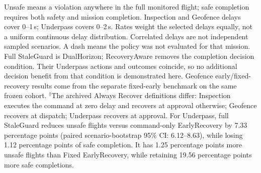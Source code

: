 \begin{table}[t]
\smallskip
\begin{minipage}{\textwidth}
\footnotesize
Unsafe means a violation anywhere in the full monitored flight;
safe completion requires both safety and mission completion.
Inspection and Geofence delays cover 0--1\,s; Underpass covers 0--2\,s.
Rates weight the selected delays equally, not a uniform continuous delay
distribution. Correlated delays are not independent sampled scenarios.
A dash means the policy was not evaluated for that mission. Full StaleGuard
is DualHorizon; RecoveryAware removes the completion decision condition.
Their Underpass actions and outcomes coincide, so no additional decision
benefit from that condition is demonstrated here.
Geofence early/fixed-recovery results come from the separate fixed-early
benchmark on the same frozen cohort.
$^{\dagger}$The archived Always Recover definitions differ: Inspection
executes the command at zero delay and recovers at approval otherwise;
Geofence recovers at dispatch; Underpass recovers at approval.
For Underpass, full StaleGuard reduces unsafe flights versus command-only
EarlyRecovery by 7.33 percentage points (paired scenario-bootstrap 95\% CI:
6.12--8.63), while losing 1.12 percentage points of safe completion.
It has 1.25 percentage points more unsafe flights than Fixed EarlyRecovery,
while retaining 19.56 percentage points more safe completions.
\end{minipage}
\endgroup
\end{table}
